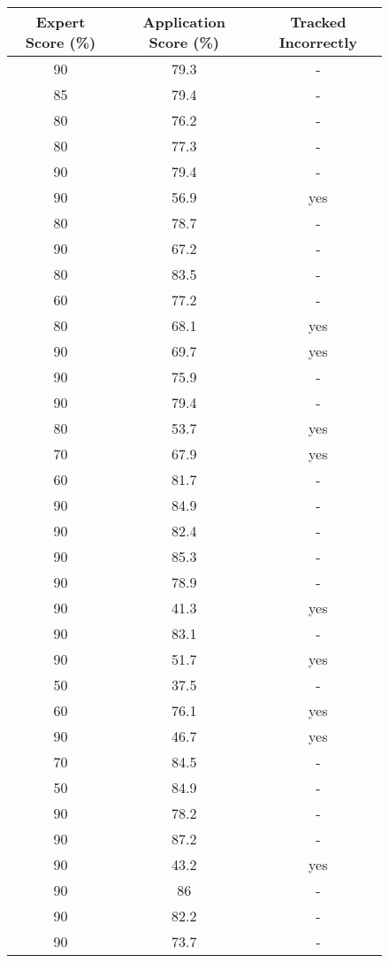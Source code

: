 \begin{figure}[H]
    \centering
	\begin{tabular}{ | c | c | c | }
	    \hline
	    \textbf{Expert Score (\%)} & \textbf{Application Score (\%)} & \textbf{Tracked Incorrectly} \\ \hline
	    90 & 79.3 & - \\ \hline
		85 & 79.4 & - \\ \hline
		80 & 76.2 & - \\ \hline
		80 & 77.3 & - \\ \hline
		90 & 79.4 & - \\ \hline
		90 & 56.9 & yes \\ \hline
		80 & 78.7 & - \\ \hline
		90 & 67.2 & - \\ \hline
		80 & 83.5 & - \\ \hline
		60 & 77.2 & - \\ \hline
		80 & 68.1 & yes \\ \hline
		90 & 69.7 & yes \\ \hline
		90 & 75.9 & - \\ \hline
		90 & 79.4 & - \\ \hline
		80 & 53.7 & yes \\ \hline
		70 & 67.9 & yes \\ \hline
		60 & 81.7 & - \\ \hline
		90 & 84.9 & - \\ \hline
		90 & 82.4 & - \\ \hline
		90 & 85.3 & - \\ \hline
		90 & 78.9 & - \\ \hline
		90 & 41.3 & yes \\ \hline
		90 & 83.1 & - \\ \hline
		90 & 51.7 & yes \\ \hline
		50 & 37.5 & - \\ \hline
		60 & 76.1 & yes \\ \hline
		90 & 46.7 & yes \\ \hline
		70 & 84.5 & - \\ \hline
		50 & 84.9 & - \\ \hline
		90 & 78.2 & - \\ \hline
		90 & 87.2 & - \\ \hline
		90 & 43.2 & yes \\ \hline
		90 & 86 & - \\ \hline
		90 & 82.2 & - \\ \hline
		90 & 73.7 & - \\ \hline

\end{tabular}
\end{figure}

